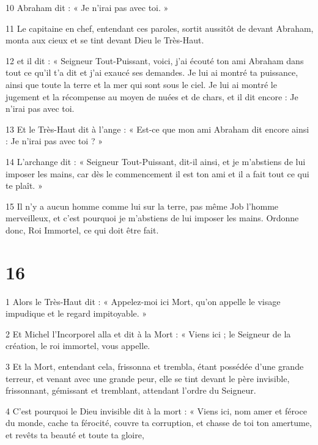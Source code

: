 \par 10 Abraham dit : « Je n'irai pas avec toi. »

\par 11 Le capitaine en chef, entendant ces paroles, sortit aussitôt de devant Abraham, monta aux cieux et se tint devant Dieu le Très-Haut.

\par 12 et il dit : « Seigneur Tout-Puissant, voici, j'ai écouté ton ami Abraham dans tout ce qu'il t'a dit et j'ai exaucé ses demandes. Je lui ai montré ta puissance, ainsi que toute la terre et la mer qui sont sous le ciel. Je lui ai montré le jugement et la récompense au moyen de nuées et de chars, et il dit encore : Je n'irai pas avec toi.

\par 13 Et le Très-Haut dit à l'ange : « Est-ce que mon ami Abraham dit encore ainsi : Je n'irai pas avec toi ? »

\par 14 L'archange dit : « Seigneur Tout-Puissant, dit-il ainsi, et je m'abstiens de lui imposer les mains, car dès le commencement il est ton ami et il a fait tout ce qui te plaît. »

\par 15 Il n'y a aucun homme comme lui sur la terre, pas même Job l'homme merveilleux, et c'est pourquoi je m'abstiens de lui imposer les mains. Ordonne donc, Roi Immortel, ce qui doit être fait.

\chapter{16}

\par 1 Alors le Très-Haut dit : « Appelez-moi ici Mort, qu'on appelle le visage impudique et le regard impitoyable. »

\par 2 Et Michel l'Incorporel alla et dit à la Mort : « Viens ici ; le Seigneur de la création, le roi immortel, vous appelle.

\par 3 Et la Mort, entendant cela, frissonna et trembla, étant possédée d'une grande terreur, et venant avec une grande peur, elle se tint devant le père invisible, frissonnant, gémissant et tremblant, attendant l'ordre du Seigneur.

\par 4 C'est pourquoi le Dieu invisible dit à la mort : « Viens ici, nom amer et féroce du monde, cache ta férocité, couvre ta corruption, et chasse de toi ton amertume, et revêts ta beauté et toute ta gloire,

